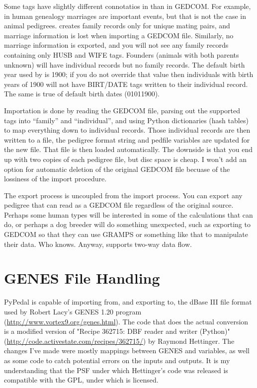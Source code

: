 Some tags have slightly different connotatios in \PyPedal{} than in {GEDCOM}. For example, in human genealogy marriages are important events, but that is not the case in animal pedigrees. \PyPedal{} creates family records only for unique mating pairs, and marriage information is lost when importing a {GEDCOM} file. Similarly, no marriage information is exported, and you will not see any family records containing only HUSB and WIFE tags. Founders (animals with both parents unknown) will have individual records but no family records. The default birth year used by \PyPedal{} is 1900; if you do not override that value then individuals with birth years of 1900 will not have BIRT/DATE tags written to their individual record. The same is true of default birth dates (01011900).

Importation is done by reading the {GEDCOM} file, parsing out the supported tags into ``family'' and ``individual'', and using Python dictionaries (hash tables) to map everything down to individual records. Those individual records are then written to a file, the pedigree format string and pedfile variables are updated for the new file. That file is then loaded automatically. The downside is that you end up with two copies of each pedigree file, but disc space is cheap. I won't add an option for automatic deletion of the original {GEDCOM} file becuase of the lossiness of the import procedure.

The export process is uncoupled from the import process. You can export any pedigree 
that \PyPedal{} can read as a {GEDCOM} file regardless of the original source. Perhaps
some human types will be interested in some of the calculations that \PyPedal{} can do,
or perhaps a dog breeder will do something unexpected, such as exporting to {GEDCOM} so
that they can use GRAMPS or something like that to manipulate their data. Who knows. Anyway, \PyPedal{} supports two-way data flow.

\chapter{GENES File Handling}\label{GENES}
PyPedal is capable of importing from, and exporting to, the dBase III file format used by Robert Lacy's GENES 1.20
program (\url{http://www.vortex9.org/genes.html}). The code that does the actual conversion is a modified version
of "Recipe 362715: DBF reader and writer (Python)" (\url{http://code.activestate.com/recipes/362715/}) by Raymond
Hettinger. The changes I've made were mostly mappings between GENES and \PyPedal{} variables, as well as some code
to catch potential errors on the inputs and outputs. It is my understanding that the PSF under which Hettinger's
code was released is compatible with the GPL, under which \PyPedal{} is licensed.

